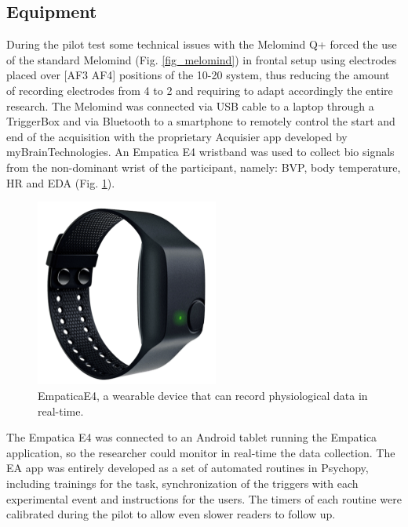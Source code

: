 \subsection{Equipment}
\label{sec:equipment}
During the pilot test some technical issues with the Melomind Q+ forced the use of the standard Melomind (Fig. \ref{fig_melomind}) in frontal setup using electrodes placed over [AF3 AF4] positions of the 10-20 system, thus reducing the amount of recording electrodes from 4 to 2 and requiring to adapt accordingly the entire research. The Melomind was connected via USB cable to a laptop through a TriggerBox and via Bluetooth to a smartphone to remotely control the start and end of the acquisition with  the proprietary Acquisier app developed by myBrainTechnologies. An Empatica E4  wristband was used to collect bio signals from the non-dominant wrist of the participant, namely: \ac{BVP}, body temperature, \ac{HR} and \ac{EDA} (Fig. \ref{fig_empatica}). 

\begin{figure}[h!]
\includegraphics[width=6cm]{img/methods/empaticaE4.png}
\centering
\caption{EmpaticaE4, a wearable device that can record physiological data in real-time.} \label{fig_empatica}
\end{figure}

The Empatica E4 was connected to an Android tablet running the Empatica application, so the researcher could monitor in real-time the data collection. The \ac{EA} app was entirely developed as a set of automated routines in Psychopy, including trainings for the task, synchronization of the triggers with each experimental event and instructions for the users. The timers of each routine were calibrated during the pilot to allow even slower readers to follow up. 

